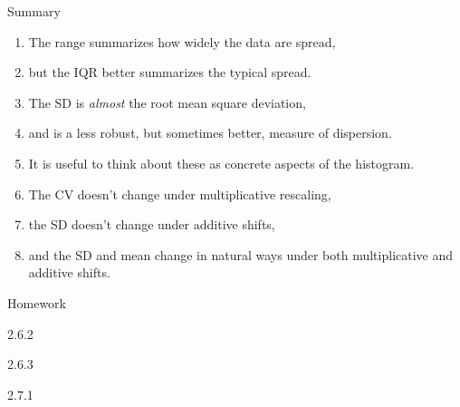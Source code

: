 \begin{frame}{Summary}
  \begin{enumerate}
    \item The range summarizes how widely the data are spread,
    \item but the IQR better summarizes the typical spread.
    \item The SD is \emph{almost} the root mean square deviation,
    \item and is a less robust, but sometimes better, measure of dispersion.
    \item It is useful to think about these as concrete aspects of the histogram.
    \item The CV doesn't change under multiplicative rescaling,
    \item the SD doesn't change under additive shifts,
    \item and the SD and mean change in natural ways under both multiplicative and additive shifts.
  \end{enumerate}
\end{frame}

\begin{frame}{Homework}
  \begin{center}

    2.6.2

  \vspace{2em}

    2.6.3

  \vspace{2em}

    2.7.1
  
  \end{center}
\end{frame}



